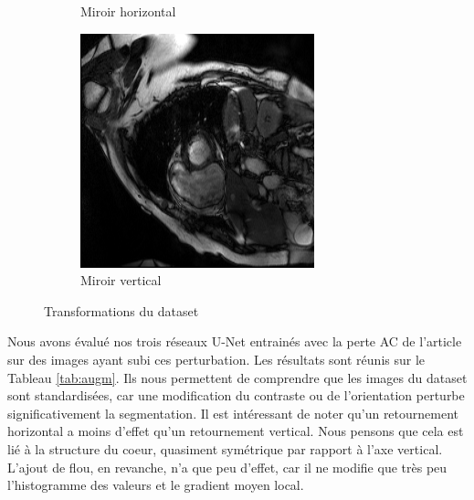 \documentclass{article}
\begin{document}
\begin{figure}[!h]
\begin{subfigure}[b]{0.19\textwidth}
         \caption{Miroir horizontal}
         \label{fig:hori}
     \end{subfigure}
     \hfill
	 \begin{subfigure}[b]{0.19\textwidth}
         \centering
         \includegraphics[width=\textwidth]{figs/modifications/vert.png}
         \caption{Miroir vertical}
         \label{fig:vert}
     \end{subfigure}
     
        \caption{Transformations du dataset}
        \label{fig:augm}
\end{figure}


Nous avons évalué nos trois réseaux U-Net entrainés avec la perte AC de l'article sur des images ayant subi ces perturbation. Les résultats sont réunis sur le Tableau \ref{tab:augm}. Ils nous permettent de comprendre que les images du dataset sont standardisées, car une modification du contraste ou de l'orientation perturbe significativement la segmentation. Il est intéressant de noter qu'un retournement horizontal a moins d'effet qu'un retournement vertical. Nous pensons que cela est lié à la structure du coeur, quasiment symétrique par rapport à l'axe vertical. L'ajout de flou, en revanche, n'a que peu d'effet, car il ne modifie que très peu l'histogramme des valeurs et le gradient moyen local. 
\end{document}
